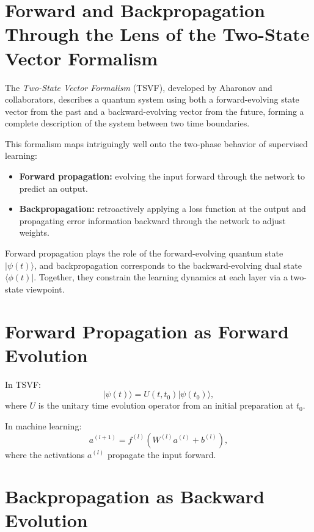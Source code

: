\documentclass[../main.tex]{subfiles} %
\begin{document}
{{{{{{\clearpage

\section{Forward and Backpropagation Through the Lens of the Two-State Vector Formalism}

The \emph{Two-State Vector Formalism} (TSVF), developed by Aharonov and collaborators, describes a quantum system using both a forward-evolving state vector from the past and a backward-evolving vector from the future, forming a complete description of the system between two time boundaries.

This formalism maps intriguingly well onto the two-phase behavior of supervised learning:

\begin{itemize}
  \item \textbf{Forward propagation:} evolving the input forward through the network to predict an output.
  \item \textbf{Backpropagation:} retroactively applying a loss function at the output and propagating error information backward through the network to adjust weights.
\end{itemize}

\begin{highlightbox}
Forward propagation plays the role of the forward-evolving quantum state \(|\psi(t)\rangle\), and backpropagation corresponds to the backward-evolving dual state \(\langle \phi(t)|\). Together, they constrain the learning dynamics at each layer via a two-state viewpoint.
\end{highlightbox}

\section{Forward Propagation as Forward Evolution}

In TSVF:
\[
|\psi(t)\rangle = U(t, t_0) |\psi(t_0)\rangle,
\]
where \(U\) is the unitary time evolution operator from an initial preparation at \(t_0\).

In machine learning:
\[
a^{(l+1)} = f^{(l)}(W^{(l)} a^{(l)} + b^{(l)}),
\]
where the activations \(a^{(l)}\) propagate the input forward.

\section{Backpropagation as Backward Evolution}

}}}}}}
\end{document}
